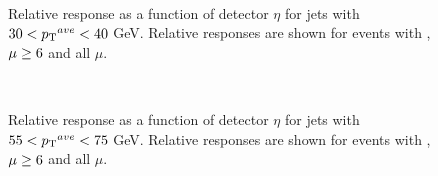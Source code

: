 \begin{figure}
\centering
\mbox{
}
\caption[Relative response as a function of $\eta$ for 2 different pile-up conditions, based on $\mu{}$, for jets with $30<\ptave{}<40$ GeV]{
Relative response as a function of detector $\eta$ for jets with $30<\ptave{}<40$ GeV.
Relative responses are shown for events with , $\rm \mu\ge6$ and all $\mu$. 
\label{JetPerf:MuComp_j15}}
\end{figure}

\begin{figure}
\centering
\mbox{
}
\caption[Relative response as a function of $\eta$ for 2 different pile-up conditions, based on $\mu{}$, for jets with $55<\ptave{}<75$ GeV]{
Relative response as a function of detector $\eta$ for jets with $55<\ptave{}<75$ GeV.
Relative responses are shown for events with , $\rm \mu\ge6$ and all $\mu$. 
\label{JetPerf:MuComp_j20}}
\end{figure}

